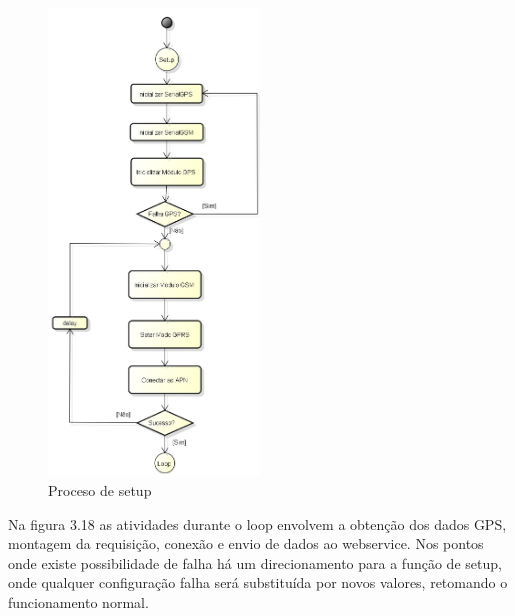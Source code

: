 \begin{figure}[!h]
	\centering
	\includegraphics[width=0.5\textwidth]{figures/ModuloVeicular_Boot.png}
	\caption{Proceso de setup}
	\label{1}
\end{figure}

Na figura 3.18 as atividades durante o loop envolvem a obtenção dos dados GPS, montagem da requisição, conexão e envio de dados ao webservice. Nos pontos onde existe possibilidade de falha há um direcionamento para a função de setup, onde qualquer configuração falha será substituída por novos valores, retomando o funcionamento normal.

